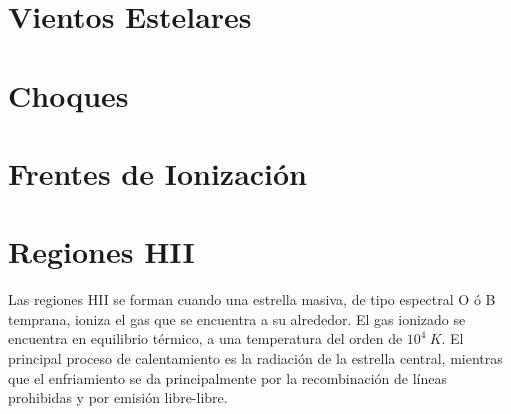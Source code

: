 \section{Vientos Estelares}
\section{Choques}
\section{Frentes de Ionización}
\section{Regiones HII}
Las regiones HII se forman cuando una estrella masiva, de tipo espectral
O ó B temprana, ioniza el gas que se encuentra a su alrededor. El gas
ionizado se encuentra en equilibrio térmico, a una temperatura del
orden de $10^4~K$. El principal proceso de calentamiento es la
radiación de la estrella central, mientras que el enfriamiento se da
principalmente por la recombinación de líneas prohibidas y por emisión
libre-libre.


